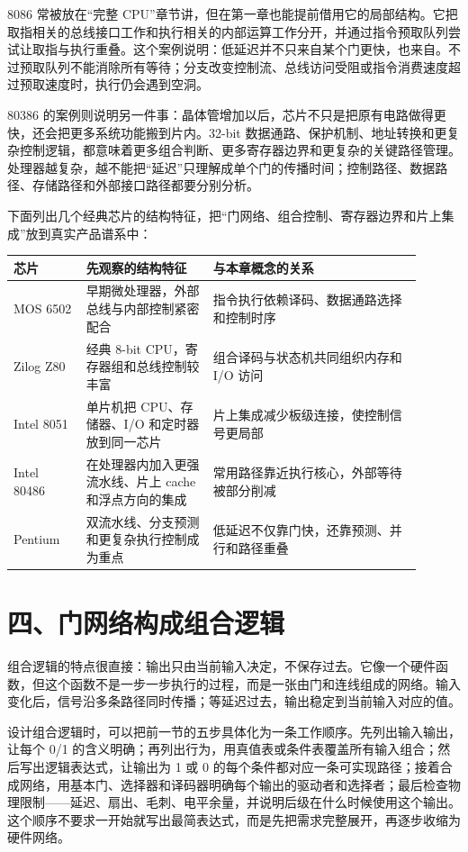 \begin{chipcase}
8086 常被放在“完整 CPU”章节讲，但在第一章也能提前借用它的局部结构。它把取指相关的总线接口工作和执行相关的内部运算工作分开，并通过指令预取队列尝试让取指与执行重叠。这个案例说明：低延迟并不只来自某个门更快，也来自。不过预取队列不能消除所有等待；分支改变控制流、总线访问受阻或指令消费速度超过预取速度时，执行仍会遇到空洞。
\end{chipcase}

80386 的案例则说明另一件事：晶体管增加以后，芯片不只是把原有电路做得更快，还会把更多系统功能搬到片内。32-bit 数据通路、保护机制、地址转换和更复杂控制逻辑，都意味着更多组合判断、更多寄存器边界和更复杂的关键路径管理。处理器越复杂，越不能把“延迟”只理解成单个门的传播时间；控制路径、数据路径、存储路径和外部接口路径都要分别分析。

下面列出几个经典芯片的结构特征，把“门网络、组合控制、寄存器边界和片上集成”放到真实产品谱系中：

\begin{longtable}{L{0.16\linewidth}L{0.28\linewidth}L{0.46\linewidth}}
\toprule
芯片 & 先观察的结构特征 & 与本章概念的关系 \\
\midrule
MOS 6502 & 早期微处理器，外部总线与内部控制紧密配合 & 指令执行依赖译码、数据通路选择和控制时序 \\
Zilog Z80 & 经典 8-bit CPU，寄存器组和总线控制较丰富 & 组合译码与状态机共同组织内存和 I/O 访问 \\
Intel 8051 & 单片机把 CPU、存储器、I/O 和定时器放到同一芯片 & 片上集成减少板级连接，使控制信号更局部 \\
Intel 80486 & 在处理器内加入更强流水线、片上 cache 和浮点方向的集成 & 常用路径靠近执行核心，外部等待被部分削减 \\
Pentium & 双流水线、分支预测和更复杂执行控制成为重点 & 低延迟不仅靠门快，还靠预测、并行和路径重叠 \\
\bottomrule
\end{longtable}

\section{四、门网络构成组合逻辑}

组合逻辑的特点很直接：输出只由当前输入决定，不保存过去。它像一个硬件函数，但这个函数不是一步一步执行的过程，而是一张由门和连线组成的网络。输入变化后，信号沿多条路径同时传播；等延迟过去，输出稳定到当前输入对应的值。

设计组合逻辑时，可以把前一节的五步具体化为一条工作顺序。先列出输入输出，让每个 0/1 的含义明确；再列出行为，用真值表或条件表覆盖所有输入组合；然后写出逻辑表达式，让输出为 1 或 0 的每个条件都对应一条可实现路径；接着合成网络，用基本门、选择器和译码器明确每个输出的驱动者和选择者；最后检查物理限制——延迟、扇出、毛刺、电平余量，并说明后级在什么时候使用这个输出。这个顺序不要求一开始就写出最简表达式，而是先把需求完整展开，再逐步收缩为硬件网络。

